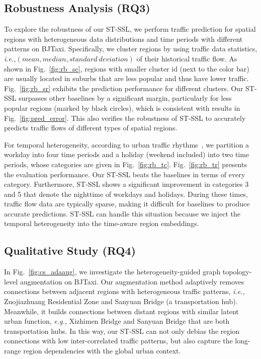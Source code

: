 \documentclass[letterpaper]{article} \usepackage{aaai23}  \usepackage{times}  \usepackage{helvet}  \usepackage{courier}  \usepackage[hyphens]{url}  \usepackage{graphicx} \urlstyle{rm} \def\UrlFont{\rm}  \usepackage{natbib}  \usepackage{caption} \frenchspacing  \setlength{\pdfpagewidth}{8.5in} \setlength{\pdfpageheight}{11in}
\newcommand{\ie}{\emph{i.e.,}\xspace}
\newcommand{\eg}{\emph{e.g.,}\xspace}
\newcommand{\name}{ST-SSL\xspace}
\newcommand{\figureautorefname}{Fig.}
\begin{document}
\subsection{Robustness Analysis (RQ3)}

To explore the robustness of our \name, we perform traffic prediction for spatial regions with heterogeneous data distributions and time periods with different patterns on BJTaxi. Specifically, we cluster regions by using traffic data statistics, \ie $(mean, median, standard~deviation)$ of their historical traffic flow. As shown in \figureautorefname{~\ref{fig:rb_sc}}, regions with smaller cluster id (next to the color bar) are usually located in suburbs that are less popular and thus have lower traffic. \figureautorefname{~\ref{fig:rb_sr}} exhibits the prediction performance for different clusters. Our \name surpasses other baselines by a significant margin, particularly for less popular regions (marked by black circles), which is consistent with results in \figureautorefname{~\ref{fig:pred_error}}. This also verifies the robustness of \name to accurately predicts traffic flows of different types of spatial regions.

For temporal heterogeneity, according to urban traffic rhythms~\cite{wang2019understanding}, we partition a workday into four time periods and a holiday (weekend included) into two time periods, whose categories are given in \figureautorefname{~\ref{fig:rb_tc}}. \figureautorefname{~\ref{fig:rb_tr}} presents the evaluation performance. Our \name beats the baselines in terms of every category. Furthermore, \name shows a significant improvement in categories 3 and 5 that denote the nighttime of workdays and holidays. During these times, traffic flow data are typically sparse, making it difficult for baselines to produce accurate predictions. \name can handle this situation because we inject the temporal heterogeneity into the time-aware region embeddings.





\subsection{Qualitative Study (RQ4)} 

In \figureautorefname~\ref{fig:cs_adaaug}, we investigate the heterogeneity-guided graph topology-level augmentation on BJTaxi. Our augmentation method adaptively removes connections between adjacent regions with heterogeneous traffic patterns, \ie Zuojiazhuang Residential Zone and Sanyuan Bridge (a transportation hub). Meanwhile, it builds connections between distant regions with similar latent urban function, \eg Xizhimen Bridge and Sanyuan Bridge that are both transportation hubs. In this way, our \name can not only debias the region connections with low inter-correlated traffic patterns, but also capture the long-range region dependencies with the global urban context.  
\end{document}
